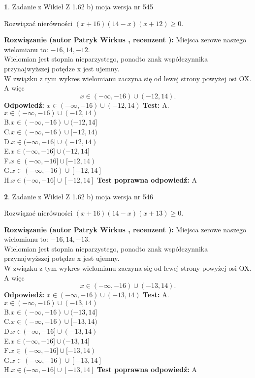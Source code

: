 \documentclass[12pt, a4paper]{article}
\theoremstyle{definition} %
\newtheorem{zad}{}
\newcommand{\zadStart}[1]{\begin{zad}#1\newline}
\newcommand{\zadStop}{\end{zad}}
\newcommand{\rozwStart}[2]{\noindent \textbf{Rozwiązanie (autor #1 , recenzent #2): }\newline}
\newcommand{\rozwStop}{\newline}
\newcommand{\odpStart}{\noindent \textbf{Odpowiedź:}\newline}
\newcommand{\odpStop}{\newline}
\newcommand{\testStart}{\noindent \textbf{Test:}\newline}
\newcommand{\testStop}{\newline}
\newcommand{\kluczStart}{\noindent \textbf{Test poprawna odpowiedź:}\newline}
\newcommand{\kluczStop}{\newline}
\begin{document}
\zadStart{Zadanie z Wikieł Z 1.62 b) moja wersja nr 545}

Rozwiązać nierówności $(x+16)(14-x)(x+12)\ge0$.
\zadStop
\rozwStart{Patryk Wirkus}{}
Miejsca zerowe naszego wielomianu to: $-16, 14, -12$.\\
Wielomian jest stopnia nieparzystego, ponadto znak współczynnika przy\linebreak najwyższej potędze x jest ujemny.\\ W związku z tym wykres wielomianu zaczyna się od lewej strony powyżej osi OX. A więc $$x \in (-\infty,-16) \cup (-12,14).$$
\rozwStop
\odpStart
$x \in (-\infty,-16) \cup (-12,14)$
\odpStop
\testStart
A.$x \in (-\infty,-16) \cup (-12,14)$\\
B.$x \in (-\infty,-16) \cup (-12,14]$\\
C.$x \in (-\infty,-16) \cup [-12,14)$\\
D.$x \in (-\infty,-16] \cup (-12,14)$\\
E.$x \in (-\infty,-16] \cup (-12,14]$\\
F.$x \in (-\infty,-16] \cup [-12,14)$\\
G.$x \in (-\infty,-16) \cup [-12,14]$\\
H.$x \in (-\infty,-16] \cup [-12,14]$
\testStop
\kluczStart
A
\kluczStop



\zadStart{Zadanie z Wikieł Z 1.62 b) moja wersja nr 546}

Rozwiązać nierówności $(x+16)(14-x)(x+13)\ge0$.
\zadStop
\rozwStart{Patryk Wirkus}{}
Miejsca zerowe naszego wielomianu to: $-16, 14, -13$.\\
Wielomian jest stopnia nieparzystego, ponadto znak współczynnika przy\linebreak najwyższej potędze x jest ujemny.\\ W związku z tym wykres wielomianu zaczyna się od lewej strony powyżej osi OX. A więc $$x \in (-\infty,-16) \cup (-13,14).$$
\rozwStop
\odpStart
$x \in (-\infty,-16) \cup (-13,14)$
\odpStop
\testStart
A.$x \in (-\infty,-16) \cup (-13,14)$\\
B.$x \in (-\infty,-16) \cup (-13,14]$\\
C.$x \in (-\infty,-16) \cup [-13,14)$\\
D.$x \in (-\infty,-16] \cup (-13,14)$\\
E.$x \in (-\infty,-16] \cup (-13,14]$\\
F.$x \in (-\infty,-16] \cup [-13,14)$\\
G.$x \in (-\infty,-16) \cup [-13,14]$\\
H.$x \in (-\infty,-16] \cup [-13,14]$
\testStop
\kluczStart
A
\kluczStop
\end{document}

